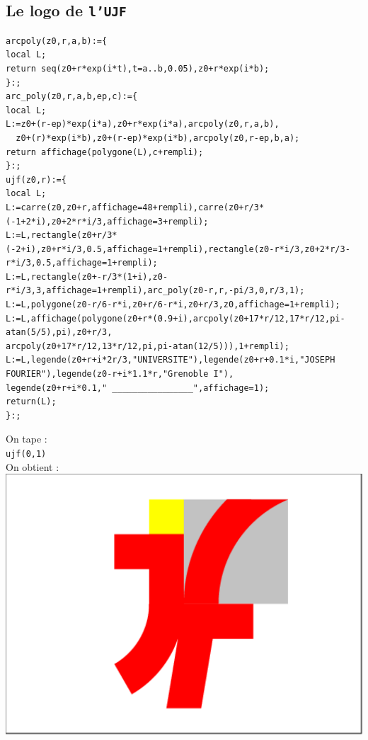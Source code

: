 \documentclass[a4paper,11pt]{book}
\begin{document}
\subsection{Le logo de {\tt l'UJF}}
\begin{verbatim}
arcpoly(z0,r,a,b):={
local L;
return seq(z0+r*exp(i*t),t=a..b,0.05),z0+r*exp(i*b);
}:;
arc_poly(z0,r,a,b,ep,c):={
local L;  
L:=z0+(r-ep)*exp(i*a),z0+r*exp(i*a),arcpoly(z0,r,a,b),
  z0+(r)*exp(i*b),z0+(r-ep)*exp(i*b),arcpoly(z0,r-ep,b,a);
return affichage(polygone(L),c+rempli);
}:;  
ujf(z0,r):={
local L;
L:=carre(z0,z0+r,affichage=48+rempli),carre(z0+r/3*(-1+2*i),z0+2*r*i/3,affichage=3+rempli);
L:=L,rectangle(z0+r/3*(-2+i),z0+r*i/3,0.5,affichage=1+rempli),rectangle(z0-r*i/3,z0+2*r/3-r*i/3,0.5,affichage=1+rempli);
L:=L,rectangle(z0+-r/3*(1+i),z0-r*i/3,3,affichage=1+rempli),arc_poly(z0-r,r,-pi/3,0,r/3,1);
L:=L,polygone(z0-r/6-r*i,z0+r/6-r*i,z0+r/3,z0,affichage=1+rempli);
L:=L,affichage(polygone(z0+r*(0.9+i),arcpoly(z0+17*r/12,17*r/12,pi-atan(5/5),pi),z0+r/3,
arcpoly(z0+17*r/12,13*r/12,pi,pi-atan(12/5))),1+rempli);
L:=L,legende(z0+r+i*2r/3,"UNIVERSITE"),legende(z0+r+0.1*i,"JOSEPH FOURIER"),legende(z0-r+i*1.1*r,"Grenoble I"),
legende(z0+r+i*0.1," ________________",affichage=1);
return(L); 
}:;
\end{verbatim}
On tape :\\
{\tt ujf(0,1)}\\
On obtient :\\
\includegraphics[width=\textwidth]{ujf}
\end{document}
